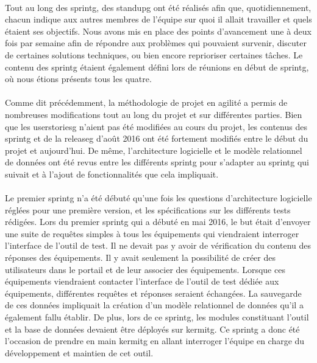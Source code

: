 \documentclass[12pt,a4paper]{report}
\begin{document}
\paragraph*{}Tout au long des \gls{sprintg}, des \gls{standupg} ont été réalisés afin que, quotidiennement, chacun indique aux autres membres de l’équipe sur quoi il allait travailler et quels étaient ses objectifs. Nous avons mis en place des points d’avancement une à deux fois par semaine afin de répondre aux problèmes qui pouvaient survenir, discuter de certaines solutions techniques, ou bien encore reprioriser certaines tâches. Le contenu des \gls{sprintg} étaient également défini lors de réunions en début de \gls{sprintg}, où nous étions présents tous les quatre.
\paragraph*{}Comme dit précédemment, la méthodologie de projet en agilité a permis de nombreuses modifications tout au long du projet et sur différentes parties. Bien que les \gls{userstoriesg} n’aient pas été modifiées au cours du projet, les contenus des \gls{sprintg} et de la \gls{releaseg} d’août 2016 ont été fortement modifiés entre le début du projet et aujourd’hui. De même, l’architecture logicielle et le modèle relationnel de données ont été revus entre les différents \gls{sprintg} pour s’adapter au \gls{sprintg} qui suivait et à l’ajout de fonctionnalités que cela impliquait.
\paragraph*{}Le premier \gls{sprintg} n’a été débuté qu’une fois les questions d’architecture logicielle réglées pour une première version, et les spécifications sur les différents tests rédigées. Lors du premier \gls{sprintg} qui a débuté en mai 2016, le but était d’envoyer une suite de requêtes simples à tous les équipements qui viendraient interroger l’interface de l’outil de test. Il ne devait pas y avoir de vérification du contenu des réponses des équipements. Il y avait seulement la possibilité de créer des utilisateurs dans le portail et de leur associer des équipements. Lorsque ces équipements viendraient contacter l’interface de l’outil de test dédiée aux équipements, différentes requêtes et réponses seraient échangées. La sauvegarde de ces données impliquait la création d’un modèle relationnel de données qu’il a également fallu établir. De plus, lors de ce \gls{sprintg}, les modules constituant l’outil et la base de données devaient être déployés sur \gls{kermitg}. Ce \gls{sprintg} a donc été l’occasion de prendre en main \gls{kermitg} en allant interroger l’équipe en charge du développement et maintien de cet outil.
\end{document}
